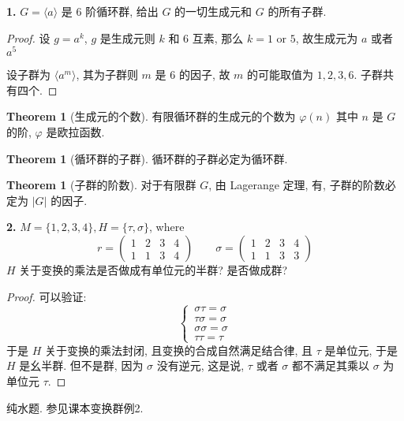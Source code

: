 \documentclass[12pt]{ctexart}
\theoremstyle{definition}
\newtheorem{thm}[definition]{Theorem}
\theoremstyle{remark}
\begin{document}
\noindent \textbf{1.} \(G = \langle a \rangle\) 是 \(6\) 阶循环群, 给出 \(G\) 的一切生成元和 \(G\) 的所有子群. 
\begin{proof}
	设 \(g = a ^{k}\), \(g\) 是生成元则 \(k\) 和 \(6\) 互素, 那么 \(k = 1 \text{ or } 5\), 故生成元为 \(a\) 或者 \(a ^{5}\)

	设子群为 \( \langle a^{m} \rangle\), 其为子群则 \(m\) 是 \(6\) 的因子, 故 \(m\) 的可能取值为 \(1 , 2, 3 , 6\). 
	子群共有四个. 
\end{proof}

\begin{thm}[生成元的个数]
\label{生成元的个数}
有限循环群的生成元的个数为 \( \varphi ( n)\) 其中 \(n\) 是 \(G\) 的阶, \( \varphi\) 是欧拉函数. 
\end{thm}

\begin{thm}[循环群的子群]
\label{循环群的子群}
循环群的子群必定为循环群. 
\end{thm}

\begin{thm}[子群的阶数]
\label{子群的阶数}
对于有限群 \(G\), 由 Lagerange 定理, 有, 子群的阶数必定为 \(|G|\) 的因子.
\end{thm}

\noindent \textbf{2. } \(M = \{ 1, 2 ,3 ,4 \} , H = \{ \tau , \sigma\}\), where 
\[
r = \left(
\begin{matrix}
	1 & 2 & 3 & 4 \\
	1 & 1 & 3 & 4
\end{matrix}
\right)
\qquad 
\sigma = \left(
\begin{matrix}
	1 & 2 & 3 & 4 \\
	1 & 1 & 3 & 3
\end{matrix}
\right)
\]
\( H\) 关于变换的乘法是否做成有单位元的半群? 是否做成群? 

\begin{proof}
可以验证:
\[
\begin{cases}
\, \sigma \tau =\sigma \\ 
\, \tau \sigma =\sigma \\ 
\, \sigma\sigma =\sigma \\ 
\, \tau \tau = \tau 
\end{cases}
\]
于是 \(H\) 关于变换的乘法封闭, 且变换的合成自然满足结合律, 且 \(\tau\) 是单位元, 于是 \(H\) 是幺半群. 但不是群, 因为 \(\sigma\) 没有逆元, 这是说, \( \tau \) 或者 \( \sigma \) 都不满足其乘以 \(\sigma\) 为单位元 \(\tau\).
\end{proof}
\medskip

\noindent 纯水题.
参见课本变换群例2. 
\end{document}
